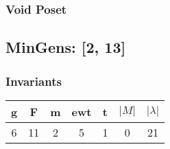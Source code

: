 \documentclass[a4paper]{article}
\begin{document}
\hfill\begin{minipage}{0.48\textwidth}
\subsubsection*{Void Poset}
\centering
\end{minipage}
\newpage\subsection{MinGens: [2, 13]}
\noindent\begin{minipage}{0.6\textwidth}
\subsubsection*{Invariants}
\centering
\begin{tabular}{|c|c|c|c|c|c|c|}
\toprule
g & F & m & ewt & t & \(|M|\) & \(|\lambda|\) \\
\midrule
6 & 11 & 2 & 5 & 1 & 0 & 21 \\
\bottomrule
\end{tabular}
\end{minipage}%
\end{document}
